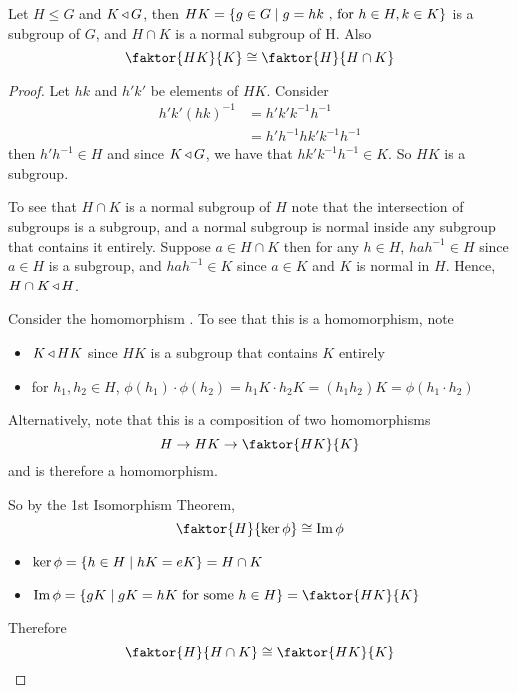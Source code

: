 \documentclass{article}
\begin{document}
\begin{thm}
    Let $H \leq G$ and $K \operatorname{\triangleleft} G$, then $HK = \left\{ g \in G \mid g = hk \ \text{, for } h \in H, k \in K \right\}$ is a subgroup of $G$, and $H \cap K$ is a normal subgroup of H.
    Also $$ \faktor{HK}{K} \cong \faktor{H}{H \cap K} $$
\end{thm}
\begin{proof}
    Let $hk$ and $h'k'$ be elements of $HK$. Consider 
    \begin{align*}
        h'k'(hk)^{-1} &= h'k'k^{-1}h^{-1} \\
        &= h' h^{-1} h k'k^{-1}h^{-1}
    \end{align*} then $h' h^{-1} \in H$ and since $K \operatorname{\triangleleft} G$, we have that $h k'k^{-1}h^{-1} \in K$. So $HK$ is a subgroup.

    To see that $H \cap K$ is a normal subgroup of $H$ note that the intersection of subgroups is a subgroup, and a normal subgroup is normal inside any subgroup that contains it entirely.
    Suppose $a \in H \cap K$ then for any $h \in H$, $h a h^{-1} \in H$ since $a \in H$ is a subgroup, and $h a h^{-1} \in K$ since $a \in K$ and $K$ is normal in $H$.
    Hence, $H \cap K \operatorname{\triangleleft} H$.

    Consider the homomorphism .
    To see that this is a homomorphism, note
    \begin{itemize}
        \item $K \operatorname{\triangleleft} HK$ since $HK$ is a subgroup that contains $K$ entirely
        \item for $h_1, h_2 \in H$, $ \phi(h_1) \cdot \phi(h_2) = h_1 K \cdot h_2 K = (h_1h_2)K = \phi(h_1 \cdot h_2)$
    \end{itemize}
    Alternatively, note that this is a composition of two homomorphisms $$ H \rightarrow HK \rightarrow \faktor{HK}{K} $$ and is therefore a homomorphism.

    So by the 1st Isomorphism Theorem, $$ \faktor{H}{\ker \phi} \cong \Im \phi $$
    \begin{itemize}
        \item $\ker \phi = \left\{ h \in H \mid hK = eK \right\} = H \cap K$
        \item $\Im \phi = \crbkt{gK \mid gK = hK \text{ for some } h \in H} = \faktor{HK}{K}$
    \end{itemize}
    Therefore $$ \faktor{H}{H \cap K} \cong \faktor{HK}{K}$$
\end{proof}
\end{document}
